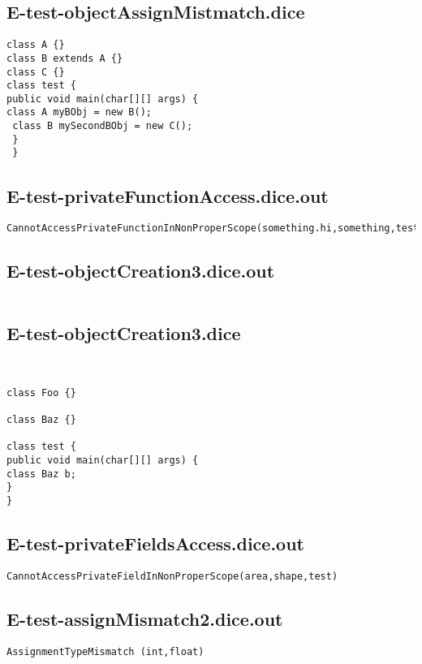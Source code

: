 \subsection{E-test-objectAssignMistmatch.dice}
\begin{verbatim}
class A {}
class B extends A {}
class C {}
class test {
public void main(char[][] args) {
class A myBObj = new B();
 class B mySecondBObj = new C();
 }
 }
\end{verbatim}
\pagebreak
\subsection{E-test-privateFunctionAccess.dice.out}
\begin{verbatim}
CannotAccessPrivateFunctionInNonProperScope(something.hi,something,test)

\end{verbatim}
\pagebreak
\subsection{E-test-objectCreation3.dice.out}
\begin{verbatim}

\end{verbatim}
\pagebreak
\subsection{E-test-objectCreation3.dice}
\begin{verbatim}


class Foo {}

class Baz {}

class test {
public void main(char[][] args) {
class Baz b;
}
}

\end{verbatim}
\pagebreak
\subsection{E-test-privateFieldsAccess.dice.out}
\begin{verbatim}
CannotAccessPrivateFieldInNonProperScope(area,shape,test)

\end{verbatim}
\pagebreak
\subsection{E-test-assignMismatch2.dice.out}
\begin{verbatim}
AssignmentTypeMismatch (int,float)

\end{verbatim}
\pagebreak
